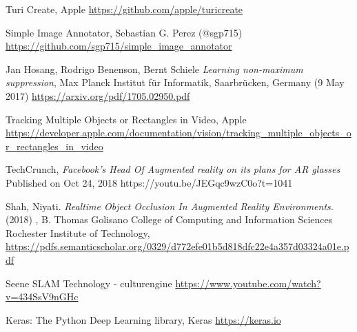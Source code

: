 \begin{thebibliography}{X}
Turi Create, Apple
\url{https://github.com/apple/turicreate}

Simple Image Annotator, Sebastian G. Perez (@sgp715)
\url{https://github.com/sgp715/simple_image_annotator}


Jan Hosang, Rodrigo Benenson, Bernt Schiele \textit{Learning non-maximum suppression}, Max Planck Institut für Informatik, Saarbrücken, Germany (9 May 2017)
\url{https://arxiv.org/pdf/1705.02950.pdf}


Tracking Multiple Objects or Rectangles in Video, Apple
\url{https://developer.apple.com/documentation/vision/tracking_multiple_objects_or_rectangles_in_video}

TechCrunch, \textit{Facebook's Head Of Augmented reality on its plans for AR glasses}
Published on Oct 24, 2018
https://youtu.be/JEGqc9wzC0o?t=1041

Shah, Niyati. \textit{Realtime Object Occlusion In Augmented Reality Environments.} (2018) , B. Thomas Golisano College of Computing and Information Sciences Rochester Institute of Technology, 
\url{https://pdfs.semanticscholar.org/0329/d772efe01b5d818dfc22e4a357d03324a01e.pdf} 


Seene SLAM Technology - culturengine
\url{https://www.youtube.com/watch?v=434SsV9nGHc}

Keras: The Python Deep Learning library, Keras
\url{https://keras.io}

\end{thebibliography}
